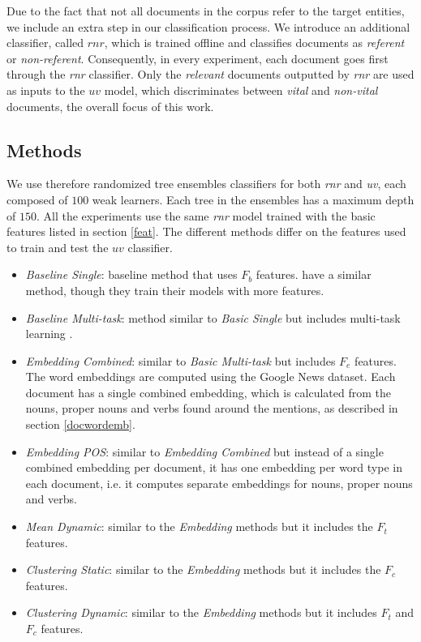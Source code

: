 \documentclass{article}
\begin{document}
Due to the fact that not all documents in the corpus refer to the target entities, we include an extra step in our classification process. We introduce an additional classifier, called $rnr$, which is trained offline and classifies documents as \emph{referent} or \emph{non-referent}.
Consequently, in every experiment, each document goes first through the \emph{rnr} classifier. Only the \emph{relevant} documents outputted by \emph{rnr} are used as inputs to the $uv$ model, which discriminates between \emph{vital} and \emph{non-vital} documents, the overall focus of this work.

\subsection{Methods}
\label{expe}

We use therefore randomized tree ensembles classifiers \cite{GEW06a} for both \emph{rnr} and \emph{uv}, each composed of $100$ weak learners. Each tree in the ensembles has a maximum depth of $150$.
%
All the experiments use the same \emph{rnr} model trained with the basic features listed in section \ref{feat}. 
The different methods differ on the features used to train and test the $uv$ classifier.

\begin{itemize}
  \item {\textit{Baseline Single}}: baseline method that uses $F_b$ features. \citet{jingang13, bellogin13} have a similar method, though they train their models with more features.
  \item {\textit{Baseline Multi-task}}: method similar to {\textit{Basic Single}} but includes multi-task learning \cite{Caruana93multitasklearning}.
  \item {\textit{Embedding Combined}}: similar to {\textit{Basic Multi-task}} but includes $F_e$ features. The word embeddings are computed using the Google News dataset. Each document has a single combined embedding, which is calculated from the nouns, proper nouns and verbs found around the mentions, as described in section \ref{docwordemb}.
  \item {\textit{Embedding POS}}: similar to {\textit{Embedding Combined}} but instead of a single combined embedding per document, it has one embedding per word type in each document, i.e. it computes separate embeddings for nouns, proper nouns and verbs. %
  \item {\textit{Mean Dynamic}}: similar to the {\textit{Embedding}} methods but it includes the $F_t$ features.
  \item {\textit{Clustering Static}}: similar to the {\textit{Embedding}} methods but it includes the $F_c$ features.
  \item {\textit{Clustering Dynamic}}: similar to the {\textit{Embedding}} methods but it includes $F_t$ and $F_c$ features.
\end{itemize}
\end{document}
